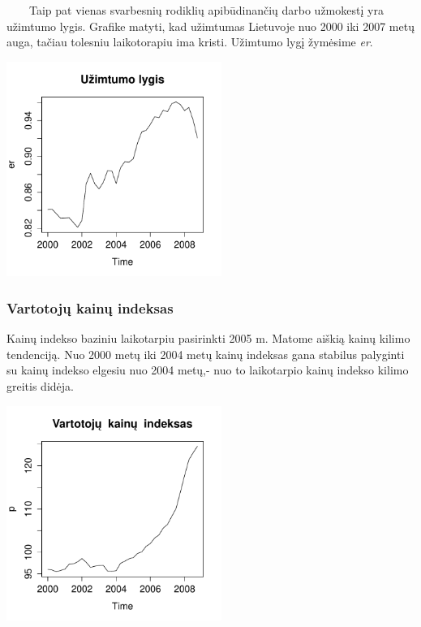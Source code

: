 \documentclass[12pt,a4paper]{article}
\theoremstyle{change}\newtheorem{salyga}{Uždavinys}
\begin{document}
\vskip 8pt
$\qquad$Taip pat vienas svarbesnių rodiklių apibūdinančių darbo užmokestį yra užimtumo lygis. Grafike matyti, kad užimtumas Lietuvoje nuo 2000 iki 2007 metų auga, tačiau tolesniu laikotorapiu ima kristi. Užimtumo lygį žymėsime \textit{er}. 
\begin{center}
\includegraphics[width=70mm,height=70mm]{er}
\end{center}



\subsubsection{Vartotojų kainų indeksas}

\hspace{40pt}Kainų indekso baziniu laikotarpiu pasirinkti 2005 m. Matome aiškią kainų kilimo tendenciją. Nuo 2000 metų iki 2004 metų kainų indeksas gana stabilus palyginti su kainų indekso elgesiu nuo 2004 metų,- nuo to laikotarpio kainų indekso kilimo greitis didėja. 
\vskip 8pt
\begin{center}
\includegraphics[width=70mm,height=70mm]{p}
\end{center}
\end{document}
